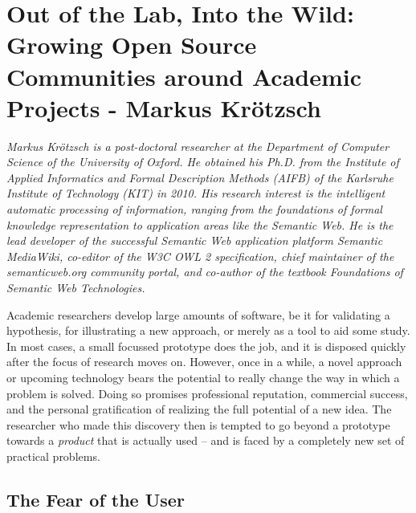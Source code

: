 \chapter{Out of the Lab, Into the Wild: Growing Open Source Communities around Academic Projects - Markus Kr\"{o}tzsch}

\textit{Markus Kr\"otzsch is a post-doctoral researcher at the Department of Computer Science of the University of Oxford. He obtained his Ph.D. from the Institute of Applied Informatics and Formal Description Methods (AIFB) of the Karlsruhe Institute of Technology (KIT) in 2010. His research interest is the intelligent automatic processing of information, ranging from the foundations of formal knowledge representation to application areas like the Semantic Web. He is the lead developer of the successful Semantic Web application platform Semantic MediaWiki, co-editor of the W3C OWL 2 specification, chief maintainer of the semanticweb.org community portal, and co-author of the textbook Foundations of Semantic Web Technologies.}

Academic researchers develop large amounts of software, be it for validating a hypothesis, for illustrating a new approach, or merely as a tool to aid some study. In most cases, a small focussed prototype does the job, and it is disposed quickly after the focus of research moves on. However, once in a while, a novel approach or upcoming technology bears the potential to really change the way in which a problem is solved. Doing so promises professional reputation, commercial success, and the personal gratification of realizing the full potential of a new idea. The researcher who made this discovery then is tempted to go beyond a prototype towards a \emph{product} that is actually used -- and is faced by a completely new set of practical problems.

\section*{The Fear of the User}

